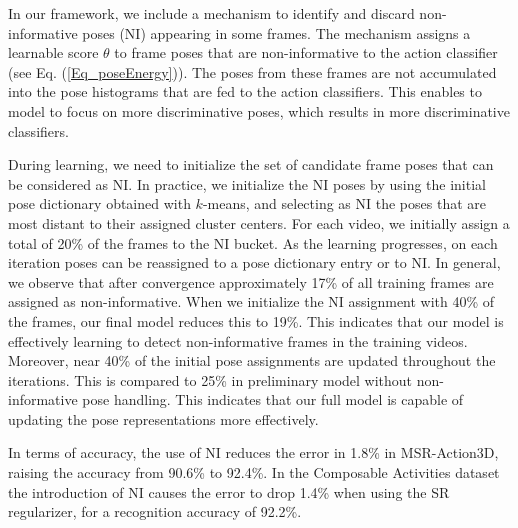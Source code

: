 In our framework, we include a mechanism to identify and discard non-informative poses (NI) 
appearing in some frames. The mechanism assigns a learnable score $\theta$ to frame poses
that are non-informative to the action classifier
(see Eq. (\ref{Eq_poseEnergy})).
The poses from these frames are not accumulated into the pose histograms that
are fed to the action classifiers.
This enables to model to focus on more discriminative poses, which results in
more discriminative classifiers.

During learning, we need to initialize the set of candidate frame poses that can be considered 
as NI.
In practice, we initialize the NI poses by using the initial pose
dictionary obtained with $k$-means, and selecting as NI the poses that are
most distant to their assigned cluster centers. For each video,
we initially assign a total of 20\% of the frames to the NI bucket.
As the learning progresses, on each iteration poses can be reassigned to
a pose dictionary entry or to NI. In general, we observe that after convergence approximately 
17\% of all training frames are assigned as non-informative.
When we initialize the NI assignment with 40\% of the frames,
our final model reduces this to 19\%.
This indicates that
our model is effectively learning to detect non-informative frames in
the training videos.
Moreover, near 40\% of the initial pose assignments are updated throughout
the iterations. This is compared to 25\% in preliminary model without
non-informative pose handling. This indicates that our full model is capable of
updating the pose representations more effectively.

In terms of accuracy, the use of NI reduces the error in 1.8\% in
MSR-Action3D, raising the accuracy from 90.6\% to 92.4\%. In the Composable Activities dataset the 
introduction of NI causes the error to
drop 1.4\% when using the SR regularizer, for a recognition accuracy of 92.2\%.
%

